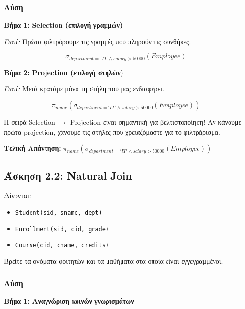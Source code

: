 \subsubsection*{Λύση}

\textbf{Βήμα 1: Selection (επιλογή γραμμών)}

\textit{Γιατί:} Πρώτα φιλτράρουμε τις γραμμές που πληρούν τις συνθήκες.

$$\sigma_{department='IT' \land salary > 50000}(Employee)$$

\textbf{Βήμα 2: Projection (επιλογή στηλών)}

\textit{Γιατί:} Μετά κρατάμε μόνο τη στήλη που μας ενδιαφέρει.

$$\pi_{name}(\sigma_{department='IT' \land salary > 50000}(Employee))$$

\begin{warningbox}
Η σειρά Selection $\to$ Projection είναι σημαντική για βελτιστοποίηση! Αν κάνουμε
πρώτα projection, χάνουμε τις στήλες που χρειαζόμαστε για το φιλτράρισμα.
\end{warningbox}

\textbf{Τελική Απάντηση:} $\pi_{name}(\sigma_{department='IT' \land salary > 50000}(Employee))$

\subsection{Άσκηση 2.2: Natural Join}

\begin{formulabox}[Εκφώνηση]
Δίνονται:
\begin{itemize}
    \item \texttt{Student(sid, sname, dept)}
    \item \texttt{Enrollment(sid, cid, grade)}
    \item \texttt{Course(cid, cname, credits)}
\end{itemize}

Βρείτε τα ονόματα φοιτητών και τα μαθήματα στα οποία είναι εγγεγραμμένοι.
\end{formulabox}

\subsubsection*{Λύση}

\textbf{Βήμα 1: Αναγνώριση κοινών γνωρισμάτων}

